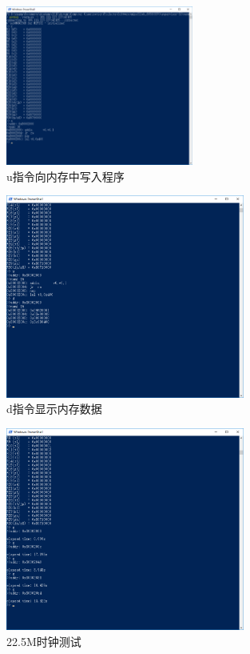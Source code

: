 \documentclass[12pt, utf8, hyperref]{ctexart}
\begin{document}
\begin{figure}[H]
    \centering
    \includegraphics[width=0.55\textwidth]{screenshots/u.png}
    \caption{u指令向内存中写入程序}
\end{figure}

\begin{figure}[H]
    \centering
    \includegraphics[width=0.7\textwidth]{screenshots/d.png}
    \caption{d指令显示内存数据}
\end{figure}

\begin{figure}[H]
    \centering
    \includegraphics[width=0.7\textwidth]{screenshots/性能测试.png}
    \caption{22.5M时钟测试}
\end{figure}
\end{document}
